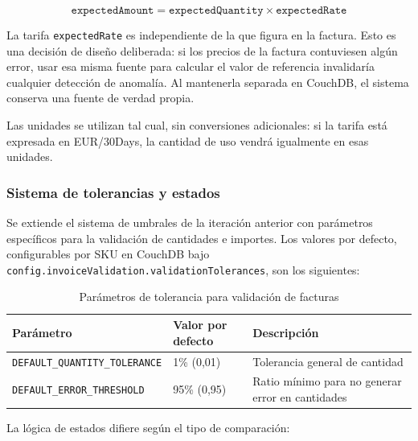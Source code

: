 \begin{equation}
    \texttt{expectedAmount} = \texttt{expectedQuantity} \times \texttt{expectedRate}
\end{equation}

La tarifa \texttt{expectedRate} es independiente de la que figura en la factura. Esto es una decisión de diseño deliberada: si los precios de la factura contuviesen algún error, usar esa misma fuente para calcular el valor de referencia invalidaría cualquier detección de anomalía. Al mantenerla separada en CouchDB, el sistema conserva una fuente de verdad propia.

Las unidades se utilizan tal cual, sin conversiones adicionales: si la tarifa está expresada en EUR/30Days, la cantidad de uso vendrá igualmente en esas unidades.

\subsubsection{Sistema de tolerancias y estados}

Se extiende el sistema de umbrales de la iteración anterior con parámetros específicos para la validación de cantidades e importes. Los valores por defecto, configurables por SKU en CouchDB bajo \texttt{config.invoiceValidation.validationTolerances}, son los siguientes:

\begin{table}[H]
    \centering
    \begin{tabular}{|p{}|p{}|p{}|}
        \hline
        \textbf{Parámetro} & \textbf{Valor por defecto} & \textbf{Descripción} \\
        \hline
        \hline
        \texttt{DEFAULT\_QUANTITY\_TOLERANCE} & 1\% (0,01) & Tolerancia general de cantidad \\
        \hline
        \texttt{DEFAULT\_ERROR\_THRESHOLD} & 95\% (0,95) & Ratio mínimo para no generar error en cantidades \\
        \hline
    \end{tabular}
    \caption{Parámetros de tolerancia para validación de facturas}
    \label{tab:tolerancias-factura}
\end{table}

La lógica de estados difiere según el tipo de comparación:

